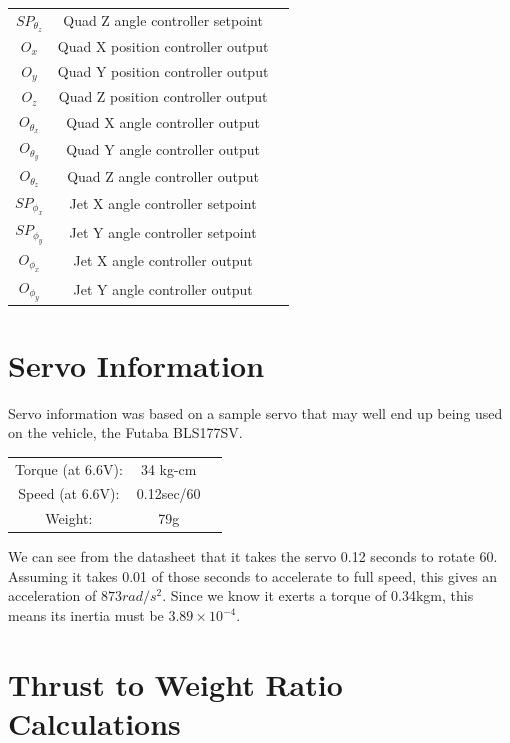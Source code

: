 \documentclass[10pt]{article}
\begin{document}
\begin{center}
\begin{longtable}{|ccc|}
    $SP_{\theta_z}$ & Quad Z angle controller setpoint & \\
    $O_x$ & Quad X position controller output & \\
    $O_y$ & Quad Y position controller output & \\
    $O_z$ & Quad Z position controller output & \\
    $O_{\theta_x}$ & Quad X angle controller output & \\
    $O_{\theta_y}$ & Quad Y angle controller output & \\
    $O_{\theta_z}$ & Quad Z angle controller output & \\
    $SP_{\phi_x}$ & Jet X angle controller setpoint & \\
    $SP_{\phi_y}$ & Jet Y angle controller setpoint & \\
    $O_{\phi_x}$ & Jet X angle controller output & \\
    $O_{\phi_y}$ & Jet Y angle controller output & \\
    \hline
\end{longtable}
\end{center}

\section{Servo Information} \label{app:servo_info}
Servo information was based on a sample servo that may well end up being used on the vehicle, the Futaba BLS177SV.

\begin{center}
\begin{tabular}{ccc}
    Torque (at 6.6V): & 34 kg-cm \\
    Speed (at 6.6V): & 0.12sec/60\textdegree{} \\
    Weight: & 79g \\
\end{tabular}
\end{center}

We can see from the datasheet that it takes the servo 0.12 seconds to rotate 60\textdegree{}. Assuming it takes 0.01 of those seconds to accelerate to full speed, this gives an acceleration of $873rad/s^2$. Since we know it exerts a torque of 0.34kgm, this means its inertia must be $3.89\times10^{-4}$.

\section{Thrust to Weight Ratio Calculations} \label{app:thrust_to_weight}
\end{document}
